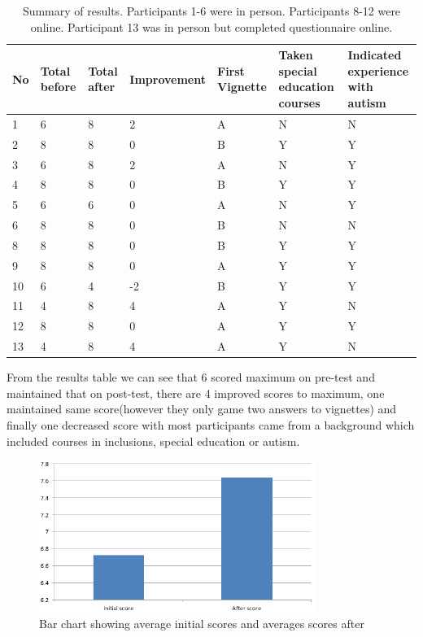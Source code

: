 \documentclass[11pt]{report}
\begin{document}
\begin{table}[H]
    \begin{tabular}{| p{1cm} | p{2cm} | p{2cm} | p{3cm} | p{3cm} | p{3cm} | p{3cm} | }
    \hline
    \textbf{No} & \textbf{Total before} & \textbf{Total after} & \textbf{Improvement} & \textbf{First Vignette} & Taken special education courses & Indicated experience with autism \\                                                                                                                                                                                    
	\hline
	1 & 6 & 8 & 2 & A & N & N \\ \hline
	2 & 8 & 8 & 0 & B & Y & Y \\ \hline
	3 & 6 & 8 & 2 & A & N & Y \\ \hline
	4 & 8 & 8 & 0 & B & Y & Y \\ \hline
	5 & 6 & 6 & 0 & A & N & Y \\ \hline
	6 & 8 & 8 & 0 & B & N & N \\ \hline
	
	8 & 8 & 8 & 0 & B & Y & Y \\ \hline
	9 & 8 & 8 & 0 & A & Y & Y \\ \hline
	10 & 6 & 4 & -2 & B & Y & Y \\ \hline
	11 & 4 & 8 & 4 & A & Y & N \\ \hline
	12 & 8 & 8 & 0 & A & Y & Y\\ \hline
	13 & 4 & 8 & 4 & A & Y & N \\ \hline
    \hline
    \end{tabular}
    \caption{Summary of results. Participants 1-6 were in person. Participants 8-12 were online. Participant 13 was in person but completed questionnaire online.}
\end{table}

From the results table we can see that 6 scored maximum on pre-test and maintained that on post-test, there are 4 improved scores to maximum, one maintained same score(however they only game two answers to vignettes) and finally one decreased score with most participants came from a background which included courses in inclusions, special education or autism. 

\begin{figure}[H]
\centering
\includegraphics[width=90mm]{images/summative/average_before_after.png}
\caption{Bar chart showing average initial scores and averages scores after }
\label{summative_average}
\end{figure}
\end{document}

